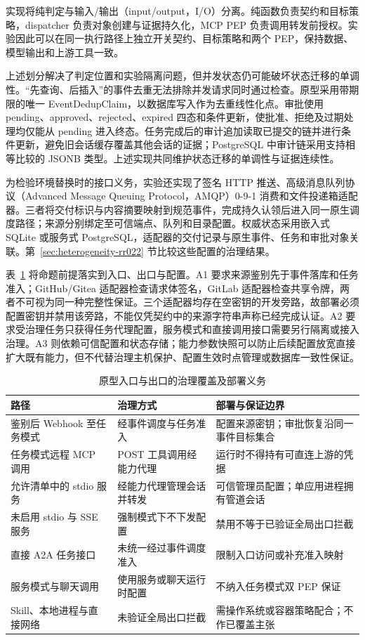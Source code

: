 实现将纯判定与输入/输出（input/output，I/O）分离。纯函数负责契约和目标策略，dispatcher 负责对象创建与证据持久化，MCP PEP 负责调用转发前授权。实验因此可以在同一执行路径上独立开关契约、目标策略和两个 PEP，保持数据、模型输出和上游工具一致。

上述划分解决了判定位置和实验隔离问题，但并发状态仍可能破坏状态迁移的单调性。“先查询、后插入”的事件去重无法排除并发请求同时通过检查。原型采用带期限的唯一 EventDedupClaim，以数据库写入作为去重线性化点。审批使用 pending、approved、rejected、expired 四态和条件更新，使批准、拒绝及过期处理均仅能从 pending 进入终态。任务完成后的审计追加读取已提交的链并进行条件更新，避免旧会话缓存覆盖其他会话的证据；PostgreSQL 中审计链采用支持相等比较的 JSONB 类型。上述实现共同维护状态迁移的单调性与证据连续性。

为检验环境替换时的接口义务，实验还实现了签名 HTTP 推送、高级消息队列协议（Advanced Message Queuing Protocol，AMQP）0-9-1 消费和文件投递箱适配器。三者将交付标识与内容摘要映射到规范事件，完成持久认领后进入同一原生调度路径；来源分别绑定至可信端点、队列和目录配置。权威状态采用嵌入式 SQLite 或服务式 PostgreSQL，适配器的交付记录与原生事件、任务和审批对象关联。第~\ref{sec:heterogeneity-rr022} 节比较这些配置的治理结果。

表~\ref{tab:entry-exit-rr022} 将命题前提落实到入口、出口与配置。A1 要求来源鉴别先于事件落库和任务准入；GitHub/Gitea 适配器检查请求体签名，GitLab 适配器检查共享令牌，两者不可视为同一种完整性保证。三个适配器均存在空密钥的开发旁路，故部署必须配置密钥并禁用该旁路，不能仅凭契约中的来源字符串声称已经完成认证。A2 要求受治理任务只获得任务代理配置，服务模式和直接调用接口需要另行隔离或接入治理。A3 则依赖可信配置和状态存储；能力参数快照可以防止后续配置放宽直接扩大既有能力，但不代替治理主机保护、配置生效时点管理或数据库一致性保证。

\begin{table}[htbp]
\centering
\caption{原型入口与出口的治理覆盖及部署义务}
\label{tab:entry-exit-rr022}
\small
\begin{tabular}{p{37mm}p{44mm}p{56mm}}
\toprule
路径 & 治理方式 & 部署与保证边界 \\
\midrule
鉴别后 Webhook 至任务模式 & 经事件调度与任务准入 & 配置来源密钥；审批恢复沿同一事件目标集合 \\
任务模式远程 MCP 调用 & POST 工具调用经能力代理 & 运行时不得持有可直连上游的凭据 \\
允许清单中的 stdio 服务 & 经能力代理管理会话并转发 & 可信管理员配置；单应用进程拥有管道会话 \\
未启用 stdio 与 SSE 服务 & 强制模式下不下发配置 & 禁用不等于已验证全局出口拦截 \\
直接 A2A 任务接口 & 未统一经过事件调度准入 & 限制入口访问或补充准入映射 \\
服务模式与聊天调用 & 使用服务或聊天运行时配置 & 不纳入任务模式双 PEP 保证 \\
Skill、本地进程与直接网络 & 未验证全局出口拦截 & 需操作系统或容器策略配合；不作已覆盖主张 \\
\bottomrule
\end{tabular}
\end{table}

